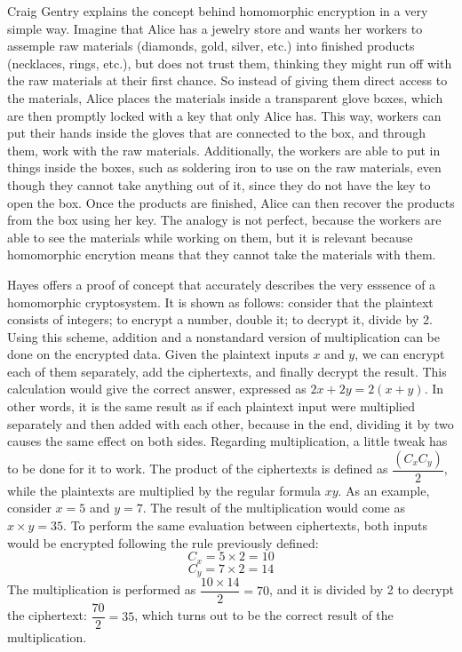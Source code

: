 Craig Gentry \cite{homenc} explains the concept behind homomorphic encryption in a very simple way. Imagine that Alice has a jewelry store and wants her workers to assemple raw materials (diamonds, gold, silver, etc.) into finished products (necklaces, rings, etc.), but does not trust them, thinking they might run off with the raw materials at their first chance. So instead of giving them direct access to the materials, Alice places the materials inside a transparent glove boxes, which are then promptly locked with a key that only Alice has. This way, workers can put their hands inside the gloves that are connected to the box, and through them, work with the raw materials. Additionally, the workers are able to put in things inside the boxes, such as soldering iron to use on the raw materials, even though they cannot take anything out of it, since they do not have the key to open the box. Once the products are finished, Alice can then recover the products from the box using her key. The analogy is not perfect, because the workers are able to see the materials while working on them, but it is relevant because homomorphic encrytion means that they cannot take the materials with them.

Hayes \cite{Hayes2012} offers a proof of concept that accurately describes the very esssence of a homomorphic cryptosystem. It is shown as follows: consider that the plaintext consists of integers; to encrypt a number, double it; to decrypt it, divide by 2. Using this scheme, addition and a nonstandard version of multiplication can be done on the encrypted data. Given the plaintext inputs $x$ and $y$, we can encrypt each of them separately, add the ciphertexts, and finally decrypt the result. This calculation would give the correct answer, expressed as $2x+2y=2(x+y)$. In other words, it is the same result as if each plaintext input were multiplied separately and then added with each other, because in the end, dividing it by two causes the same effect on both sides. 
Regarding multiplication, a little tweak has to be done for it to work. The product of the ciphertexts is defined as $\dfrac{(C_{x} C_{y})}{2}$, while the plaintexts are multiplied by the regular formula $xy$. 
As an example, consider $x=5$ and $y=7$. The result of the multiplication would come as $x \times y = 35$. To perform the same evaluation between ciphertexts, both inputs would be encrypted following the rule previously defined:
\begin{equation}
C_{x} = 5 \times 2 = 10
\end{equation}
\begin{equation}
C_{y} = 7 \times 2 = 14
\end{equation}
The multiplication is performed as $\dfrac{10 \times 14}{2} = 70$, and it is divided by 2 to decrypt the ciphertext: $\dfrac{70}{2} = 35$, which turns out to be the correct result of the multiplication.

